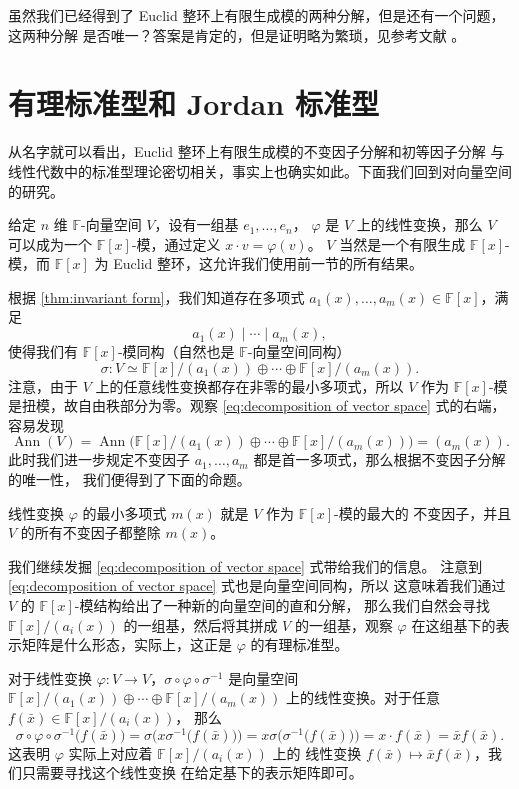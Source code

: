 \documentclass[fontset=none,zihao=-4]{Notes}
\DeclareMathOperator\Ann{Ann}
\begin{document}
虽然我们已经得到了 Euclid 整环上有限生成模的两种分解，但是还有一个问题，这两种分解
是否唯一？答案是肯定的，但是证明略为繁琐，见参考文献 \cite{Dummit}。

\section{有理标准型和 Jordan 标准型}

从名字就可以看出，Euclid 整环上有限生成模的不变因子分解和初等因子分解
与线性代数中的标准型理论密切相关，事实上也确实如此。下面我们回到对向量空间的研究。

给定 $n$ 维 $\mathbb{F}$-向量空间 $V$，设有一组基 $e_1,\dots,e_n$，
$\varphi$ 是 $V$ 上的线性变换，那么 $V$ 可以成为一个
$\mathbb{F}[x]$-模，通过定义 $x\cdot v=\varphi(v)$。
$V$ 当然是一个有限生成 $\mathbb{F}[x]$-模，而 $\mathbb{F}[x]$
为 Euclid 整环，这允许我们使用前一节的所有结果。

根据 \autoref{thm:invariant form}，我们知道存在多项式
$a_1(x),\dots,a_m(x)\in \mathbb{F}[x]$，满足
\[
  a_1(x)\mid \cdots\mid a_m(x),  
\]
使得我们有 $\mathbb{F}[x]$-模同构（自然也是 $\mathbb{F}$-向量空间同构）
\begin{equation}\label{eq:decomposition of vector space}
  \sigma:V\simeq \mathbb{F}[x]/(a_1(x))\oplus \cdots\oplus \mathbb{F}[x]/(a_m(x)).
\end{equation}
注意，由于 $V$ 上的任意线性变换都存在非零的最小多项式，所以 $V$ 作为
$\mathbb{F}[x]$-模是扭模，故自由秩部分为零。观察 \eqref{eq:decomposition of vector space}
式的右端，容易发现
\[
  \Ann(V)=\Ann\bigl(\mathbb{F}[x]/(a_1(x))\oplus \cdots\oplus \mathbb{F}[x]/(a_m(x))\bigr)  
  =(a_m(x)).
\]
此时我们进一步规定不变因子 $a_1,\dots,a_m$ 都是首一多项式，那么根据不变因子分解的唯一性，
我们便得到了下面的命题。

\begin{proposition}
  线性变换 $\varphi$ 的最小多项式 $m(x)$ 就是 $V$ 作为 $\mathbb{F}[x]$-模的最大的
  不变因子，并且 $V$ 的所有不变因子都整除 $m(x)$。
\end{proposition}

我们继续发掘 \eqref{eq:decomposition of vector space} 式带给我们的信息。
注意到 \eqref{eq:decomposition of vector space} 式也是向量空间同构，所以
这意味着我们通过 $V$ 的 $\mathbb{F}[x]$-模结构给出了一种新的向量空间的直和分解，
那么我们自然会寻找 $\mathbb{F}[x]/(a_i(x))$ 的一组基，然后将其拼成 $V$
的一组基，观察 $\varphi$ 在这组基下的表示矩阵是什么形态，实际上，这正是
$\varphi$ 的有理标准型。

对于线性变换 $\varphi:V\to V$，$\sigma\circ \varphi\circ \sigma^{-1}$
是向量空间 $\mathbb{F}[x]/(a_1(x))\oplus \cdots\oplus \mathbb{F}[x]/(a_m(x))$
上的线性变换。对于任意 $f(\bar x)\in \mathbb{F}[x]/(a_i(x))$，
那么
\[
  \sigma\circ \varphi\circ \sigma^{-1}\bigl(f(\bar x)\bigr)
  =\sigma\bigl(x\sigma^{-1}\bigl(f(\bar x)\bigr)\bigr)
  =x\sigma\bigl(\sigma^{-1}\bigl(f(\bar x)\bigr)\bigr)
  =x\cdot f(\bar x)=\bar x f(\bar x).
\]
这表明 $\varphi$ 实际上对应着 $\mathbb{F}[x]/(a_i(x))$ 上的
线性变换 $f(\bar x)\mapsto \bar xf(\bar x)$，我们只需要寻找这个线性变换
在给定基下的表示矩阵即可。
\end{document}
